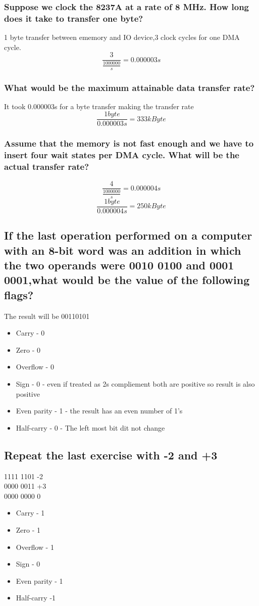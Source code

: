 \documentclass[12pt, a4paper]{article}
\begin{document}
			\subsubsection{Suppose we clock the 8237A at a rate of 8 MHz. How long does it take to transfer one byte?}
				1 byte transfer between ememory and IO device,3 clock cycles for one DMA cycle.\\
				$$\frac{3}{\frac{1000000}{s}}=0.000003s$$
			\subsubsection{What would be the maximum attainable data transfer rate?}
				It took 0.000003s for a byte transfer making the transfer rate \\
				$$\frac{1byte}{0.000003s}=333kByte$$
			\subsubsection{Assume that the memory is not fast enough and we have to insert four wait states per DMA cycle. What will be the actual transfer rate?}
				$$\frac{4}{\frac{1000000}{s}}=0.000004s$$
				$$\frac{1byte}{0.000004s}=250kByte$$
		\subsection{If the last operation performed on a computer with an 8-bit word was an addition in which the two operands were 0010 0100 and 0001 0001,what would be the value of the following flags?}
			The result will be 00110101\\
			\begin{itemize}
				\item Carry - 0
				\item Zero - 0
				\item Overflow - 0
				\item Sign - 0 - even if treated as 2s compliement both are positive so result is also positive
				\item Even parity - 1 - the result has an even number of 1's
				\item Half-carry - 0 - The left most bit dit not change
			\end{itemize}
		\subsection{Repeat the last exercise with -2 and +3}
			1111 1101 -2\\
			0000 0011 +3\\
			0000 0000 0\\
			\begin{itemize}
				\item Carry - 1
				\item Zero - 1
				\item Overflow - 1
				\item Sign - 0 
				\item Even parity - 1
				\item Half-carry -1
			\end{itemize}
\end{document}
